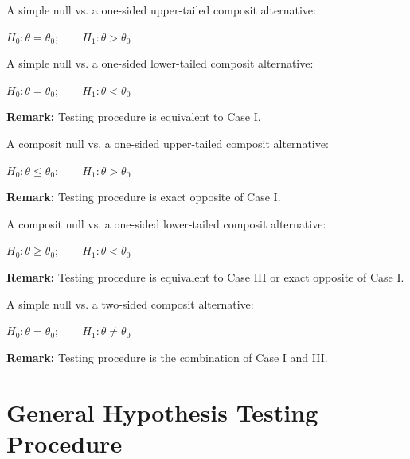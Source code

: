 \documentclass[12pt]{book}
\begin{document}
\begin{description}
\item[Case I]  A simple null vs. a one-sided upper-tailed composit
alternative:

$H_{0}:\theta =\theta _{0};\qquad H_{1}:\theta >\theta _{0}$

\item[Case II]  A simple null vs. a one-sided lower-tailed composit
alternative:

$H_{0}:\theta =\theta _{0};\qquad H_{1}:\theta <\theta _{0}$

\textbf{Remark: }Testing procedure is equivalent to Case I.

\item[Case III]  A composit null vs. a one-sided upper-tailed composit
alternative:

$H_{0}:\theta \leq \theta _{0};\qquad H_{1}:\theta >\theta _{0}$

\item  \textbf{Remark: }Testing procedure is exact opposite of Case I.

\item[Case IV]  A composit null vs. a one-sided lower-tailed composit
alternative:

$H_{0}:\theta \geq \theta _{0};\qquad H_{1}:\theta <\theta _{0}$

\item  \textbf{Remark: }Testing procedure is equivalent to Case III or exact
opposite of Case I.

\item[Case V]  A simple null vs. a two-sided composit alternative:

$H_{0}:\theta =\theta _{0};\qquad H_{1}:\theta \neq \theta _{0}$

\textbf{Remark: }Testing procedure is the combination of Case I and III.
\end{description}

\section{General Hypothesis Testing Procedure}
\end{document}
